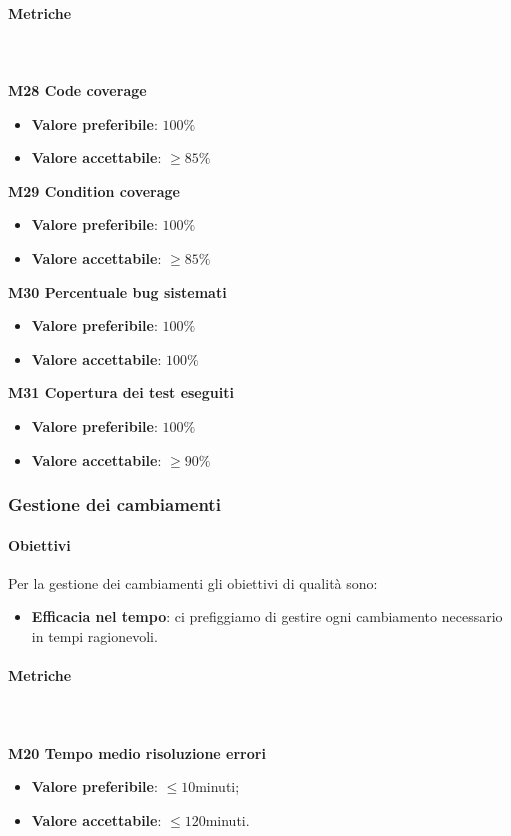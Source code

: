		\paragraph{Metriche} \mbox{} \\ \\
		\textbf{M28 Code coverage}
		\begin{itemize}
			\item \textbf{Valore preferibile}: $100\%$
			\item \textbf{Valore accettabile}: $\ge 85\%$
		\end{itemize}
		\textbf{M29 Condition coverage}
		\begin{itemize}
			\item \textbf{Valore preferibile}: $100\%$
			\item \textbf{Valore accettabile}: $\ge 85\%$ 
		\end{itemize}
		\textbf{M30 Percentuale bug sistemati}
		\begin{itemize}
			\item \textbf{Valore preferibile}: $100\%$
			\item \textbf{Valore accettabile}: $100\%$  
		\end{itemize}
		\textbf{M31 Copertura dei test eseguiti}
		\begin{itemize}
			\item \textbf{Valore preferibile}: $100\%$
			\item \textbf{Valore accettabile}: $\ge 90\%$  
		\end{itemize}
			
		\subsubsection{Gestione dei cambiamenti}
		\paragraph{Obiettivi}
		Per la gestione dei cambiamenti gli obiettivi di qualità sono:
		\begin{itemize}
			\item \textbf{Efficacia nel tempo}: ci prefiggiamo di gestire ogni cambiamento necessario in tempi ragionevoli.
		\end{itemize}
		 	\paragraph{Metriche} \mbox{} \\ \\
		 	\textbf{M20 Tempo medio risoluzione errori}
			\begin{itemize}
				\item \textbf{Valore preferibile}: $\le 10$minuti;
				\item \textbf{Valore accettabile}: $\le 120$minuti.
			\end{itemize}

		  
			
				

